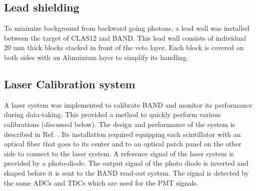 \documentclass[3p,final,twocolumn]{elsarticle}
\begin{document}
\subsection{Lead shielding}
To minimize background from backward going photons, a lead wall was installed between the target of CLAS12 and BAND. This lead wall consists of individual 20 \si{\milli\meter} thick blocks stacked in front of the veto layer. Each block is covered on both sides with an Aluminium layer to simplify its handling.






\subsection{Laser Calibration system}
A laser system was implemented to calibrate BAND and monitor its performance during data-taking. This 
provided a method to quickly perform various calibrations (discussed below). The design and performance of the system is described in Ref. \cite{band-laser}. 
Its installation required equipping each scintillator with an optical fiber that goes to its center and to an optical patch panel on the other side to connect to the laser system.
A reference signal of the laser system is provided by a photo-diode. The output signal of the photo diode is inverted and shaped before it is sent to the BAND read-out system. The signal is detected by the same ADCs and TDCs which are used for the PMT signals.
\end{document}
